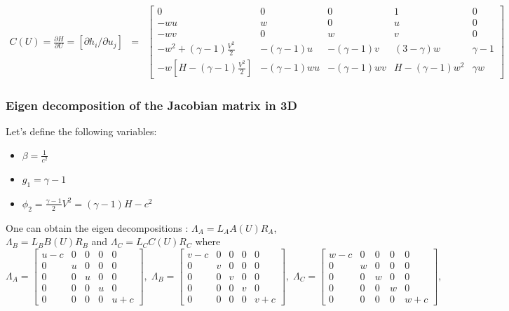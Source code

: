 \documentclass{article}
\begin{document}
\begin{eqnarray}
  C(U) = \frac{\partial H}{\partial U} = \left[ \partial h_i/\partial u_j \right] & = & \left[
    \begin{array}{ccccc}
      0 & 0 & 0 & 1 & 0\\
      -w u & w & 0 & u & 0\\
      -w v & 0 & w & v & 0\\
      -w^2+(\gamma-1)\frac{V^2}{2} & -(\gamma-1)u & -(\gamma-1)v & (3-\gamma) w &  \gamma-1\\
      -w [H - (\gamma-1)\frac{V^2}{2}] & -(\gamma-1)wu & -(\gamma-1)wv & H-(\gamma-1)w^2 & \gamma w
    \end{array}
  \right]
\end{eqnarray}

\subsubsection{Eigen decomposition of the Jacobian matrix in 3D}

Let's define the following variables: 
\begin{itemize}
\item $\beta = \frac{1}{c^2}$
\item $g_1 = \gamma-1$
\item $\phi_2 = \frac{\gamma-1}{2}V^2 = (\gamma-1) H - c^2$
\end{itemize}

One can obtain the eigen decompositions : $\Lambda_A = L_A A(U) R_A$, $\Lambda_B = L_B B(U) R_B$ and $\Lambda_C = L_C C(U) R_C$ where
\begin{equation}
  \Lambda_A = \left[
    \begin{array}{ccccc}
      u-c& 0 & 0 & 0 & 0\\
      0  & u & 0 & 0 & 0\\
      0  & 0 & u & 0 & 0\\
      0  & 0 & 0 & u & 0\\
      0  & 0 & 0 & 0 & u+c
    \end{array}
  \right],\;
  \Lambda_B = \left[
    \begin{array}{ccccc}
      v-c& 0 & 0 & 0 & 0\\
      0  & v & 0 & 0 & 0\\
      0  & 0 & v & 0 & 0\\
      0  & 0 & 0 & v & 0\\
      0  & 0 & 0 & 0 & v+c
    \end{array}
  \right],\;
  \Lambda_C = \left[
    \begin{array}{ccccc}
      w-c& 0 & 0 & 0 & 0\\
      0  & w & 0 & 0 & 0\\
      0  & 0 & w & 0 & 0\\
      0  & 0 & 0 & w & 0\\
      0  & 0 & 0 & 0 & w+c
    \end{array}
  \right],\;
\end{equation}
\end{document}
